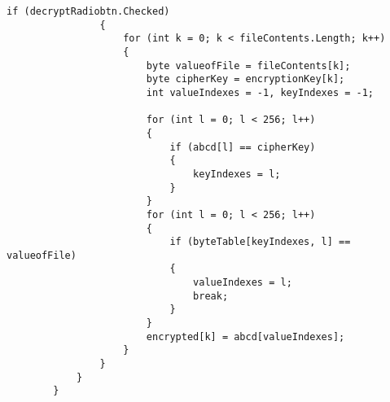 \begin{lstlisting}[caption=B\&G Cipher File Source Code]
                if (decryptRadiobtn.Checked)
                {
                    for (int k = 0; k < fileContents.Length; k++)
                    {
                        byte valueofFile = fileContents[k];
                        byte cipherKey = encryptionKey[k];
                        int valueIndexes = -1, keyIndexes = -1;

                        for (int l = 0; l < 256; l++)
                        {
                            if (abcd[l] == cipherKey)
                            {
                                keyIndexes = l;
                            }
                        }
                        for (int l = 0; l < 256; l++)
                        {
                            if (byteTable[keyIndexes, l] == valueofFile)
                            {
                                valueIndexes = l;
                                break;
                            }
                        }
                        encrypted[k] = abcd[valueIndexes];
                    }
                }
            }
        }
\end{lstlisting}
